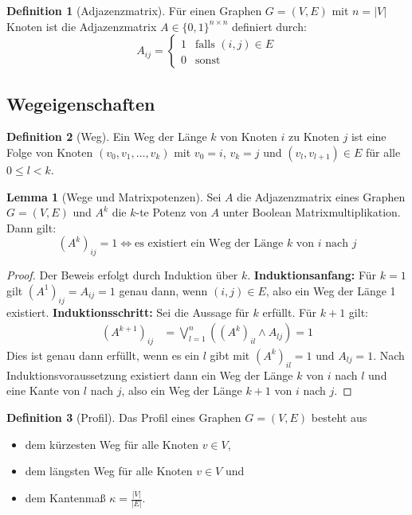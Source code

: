 ﻿\documentclass[a4paper,12pt]{article}
\theoremstyle{definition}
\newtheorem{definition}{Definition}
\newtheorem{lemma}{Lemma}
\begin{document}
	\begin{definition}[Adjazenzmatrix]
		Für einen Graphen $G = (V, E)$ mit $n = |V|$ Knoten ist die Adjazenzmatrix $A \in \{0,1\}^{n \times n}$ definiert durch:
		\[
		A_{ij} = \begin{cases} 1 & \text{falls } (i,j) \in E \\ 0 & \text{sonst} \end{cases}
		\]
	\end{definition}
	
	\subsection{Wegeigenschaften}
	\begin{definition}[Weg]
		Ein Weg der Länge $k$ von Knoten $i$ zu Knoten $j$ ist eine Folge von Knoten $(v_0, v_1, \ldots, v_k)$ mit $v_0 = i$, $v_k = j$ und $(v_l, v_{l+1}) \in E$ für alle $0 \leq l < k$.
	\end{definition}
	
	\begin{lemma}[Wege und Matrixpotenzen]
		Sei $A$ die Adjazenzmatrix eines Graphen $G = (V,E)$ und $A^k$ die $k$-te Potenz von $A$ unter Boolean Matrixmultiplikation. Dann gilt:
		\[
		(A^k)_{ij} = 1 \Leftrightarrow \text{es existiert ein Weg der Länge } k \text{ von } i \text{ nach } j
		\]
	\end{lemma}
	
	\begin{proof}
		Der Beweis erfolgt durch Induktion über $k$.\newline
		\textbf{Induktionsanfang:} Für $k=1$ gilt $(A^1)_{ij} = A_{ij} = 1$ genau dann, wenn $(i,j) \in E$, also ein Weg der Länge 1 existiert.\newline
		\textbf{Induktionsschritt:} Sei die Aussage für $k$ erfüllt. Für $k+1$ gilt:
		\begin{align*}
			(A^{k+1})_{ij} &= \bigvee_{l=1}^{n} ((A^k)_{il} \wedge A_{lj}) = 1
		\end{align*}
		Dies ist genau dann erfüllt, wenn es ein $l$ gibt mit $(A^k)_{il} = 1$ und $A_{lj} = 1$. Nach Induktionsvoraussetzung existiert dann ein Weg der Länge $k$ von $i$ nach $l$ und eine Kante von $l$ nach $j$, also ein Weg der Länge $k+1$ von $i$ nach $j$.
	\end{proof}
	
	\begin{definition}[Profil]
		Das Profil eines Graphen $G=(V, E)$ besteht aus 
		\begin{itemize}
			\item[-] dem kürzesten Weg für alle Knoten $v \in V$,
			\item[-] dem längsten Weg für alle Knoten $v \in V$ und
			\item[-] dem Kantenmaß $\kappa = \frac{\left|V\right|}{\left|E\right|}$.
		\end{itemize}
	\end{definition}
	
\end{document}
